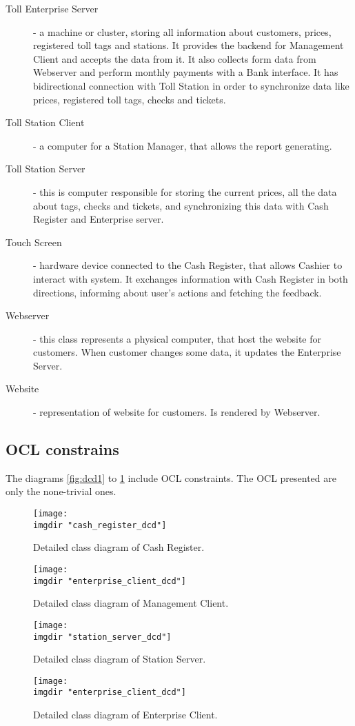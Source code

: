 \begin{description}
\item[Toll Enterprise Server] - a machine or cluster, storing all information about customers, prices, registered toll tags and stations. It provides the backend for Management Client and accepts the data from it. It also collects form data from Webserver and perform monthly payments with a Bank interface. It has bidirectional connection with Toll Station in order to synchronize data like prices, registered toll tags, checks and tickets. 
\item [Toll Station Client] - a computer for a Station Manager, that allows the report generating.
\item [Toll Station Server] - this is computer responsible for storing the current prices, all the data about tags, checks and tickets, and synchronizing this data with Cash Register and Enterprise server.
\item [Touch Screen] - hardware device connected to the Cash Register, that allows Cashier to interact with system. It exchanges information with Cash Register in both directions, informing about user's actions and fetching the feedback. 
\item[Webserver] - this class represents a physical computer, that host the website for customers. When customer changes some data, it updates the Enterprise Server.
\item[Website] - representation of website for customers. Is rendered by Webserver.
\end{description}

\subsection{OCL constrains}
The diagrams \ref{fig:dcd1} to \ref{fig:dcd_ec} include OCL constraints. The OCL presented are only the none-trivial ones. 
\begin{figure}
  \centering
  \texttt{[image: \\imgdir "cash\_register\_dcd"]}
  \caption{Detailed class diagram of Cash Register.}
  \label{fig:dcd_cr}
  \texttt{[image: \\imgdir "enterprise\_client\_dcd"]}
  \caption{Detailed class diagram of Management Client.}
  \label{fig:dcd_mc}
  \texttt{[image: \\imgdir "station\_server\_dcd"]}
  \caption{Detailed class diagram of Station Server.}
  \label{fig:dcd_ss}
  \texttt{[image: \\imgdir "enterprise\_client\_dcd"]}
  \caption{Detailed class diagram of Enterprise Client.}
  \label{fig:dcd_ec}
\end{figure}

